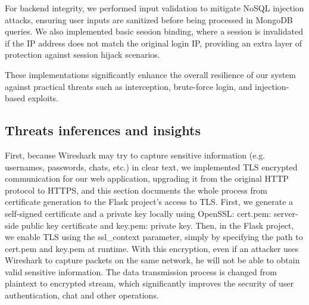 \documentclass{article}
\begin{document}
For backend integrity, we performed input validation to mitigate NoSQL injection attacks, ensuring user inputs are sanitized before being processed in MongoDB queries. We also implemented basic session binding, where a session is invalidated if the IP address does not match the original login IP, providing an extra layer of protection against session hijack scenarios.

These implementations significantly enhance the overall resilience of our system against practical threats such as interception, brute-force login, and injection-based exploits.

\subsection{Threats inferences and insights}
First, because Wireshark may try to capture sensitive information (e.g. usernames, passwords, chats, etc.) in clear text, we implemented TLS encrypted communication for our web application, upgrading it from the original HTTP protocol to HTTPS, and this section documents the whole process from certificate generation to the Flask project's access to TLS. 
First, we generate a self-signed certificate and a private key locally using OpenSSL: cert.pem: server-side public key certificate and key.pem: private key. Then, in the Flask project, we enable TLS using the ssl\_context parameter, simply by specifying the path to cert.pem and key.pem at runtime. 
With this encryption, even if an attacker uses Wireshark to capture packets on the same network, he will not be able to obtain valid sensitive information. 
The data transmission process is changed from plaintext to encrypted stream, which significantly improves the security of user authentication, chat and other operations.
\end{document}
